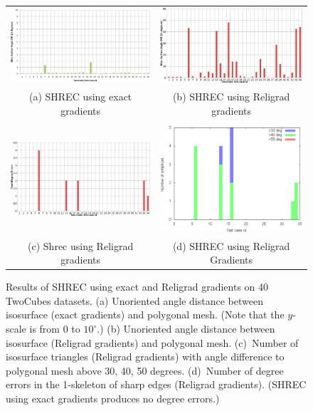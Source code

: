 \begin{figure}[tp]
\begin{tabular}{cc}
\includegraphics[width=0.45\linewidth]{images/tw1.eps} &
\includegraphics[width=0.45\linewidth]{images/tw2.eps} \\
(a) SHREC using exact gradients & (b) SHREC using Religrad gradients \\
\\
\includegraphics[height=0.25\linewidth]{images/tw3.eps} &
\includegraphics[height=0.25\linewidth]{images/twoCube35_test_1.eps} \\
(c) Shrec using Religrad gradients & (d) SHREC using Religrad Gradients
\end{tabular}

\caption{Results of SHREC using exact and Religrad gradients 
on 40 TwoCubes datasets. 
(a) Unoriented angle distance between isosurface (exact gradients)
and polygonal mesh.
(Note that the $y$-scale is from 0 to $10^\circ$.)
(b) Unoriented angle distance between isosurface (Religrad gradients)
and polygonal mesh.
(c)~Number of isosurface triangles (Religrad gradients)
with angle difference to polygonal mesh above 30, 40, 50 degrees.
(d)~Number of degree errors in the 1-skeleton of sharp edges
(Religrad gradients).
(SHREC using exact gradients produces no degree errors.)}
\label{fig:shrecTwoCube}

\end{figure}


